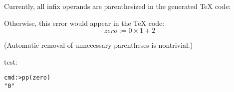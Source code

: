 \documentclass{../src/led_doc}
\begin{document}
\begin{ledCmnt}
Currently, all infix operands are parenthesized in the generated \TeX{} code:
\end{ledCmnt}

\begin{ledDef}
\end{ledDef}

\begin{ledCmnt}
Otherwise, this error would appear in the \TeX{} code:
$$ zero := 0 \times 1 + 2 $$

(Automatic removal of unnecessary parentheses is nontrivial.)

test:
\begin{verbatim}
cmd:>pp(zero)
"0"
\end{verbatim}
\end{ledCmnt}
\end{document}
